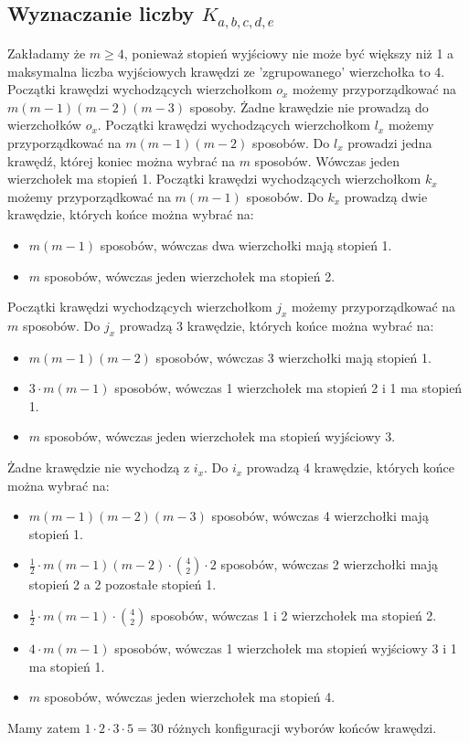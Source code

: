 \documentclass{article}
\begin{document}
\newpage

\subsection{Wyznaczanie liczby $K_{a,b,c,d,e}$}
Zakładamy że $m \geq 4$, ponieważ stopień wyjściowy nie może być większy niż 1 a maksymalna liczba wyjściowych krawędzi ze 'zgrupowanego' wierzchołka to 4.
\newline \newline
Początki krawędzi wychodzących wierzchołkom $o_x$ możemy przyporządkować na $m (m-1) (m-2) (m-3)$ sposoby.
Żadne krawędzie nie prowadzą do wierzchołków $o_x$.
\newline
Początki krawędzi wychodzących wierzchołkom $l_x$ możemy przyporządkować na $m (m-1) (m-2)$ sposobów.
Do $l_x$ prowadzi jedna krawędź, której koniec można wybrać na $m$ sposobów. Wówczas jeden wierzchołek ma stopień 1. 
\newline
Początki krawędzi wychodzących wierzchołkom $k_x$ możemy przyporządkować na $m (m-1)$ sposobów.
Do $k_x$ prowadzą dwie krawędzie, których końce można wybrać na:
\begin{itemize}
  \item $m (m-1)$ sposobów, wówczas dwa wierzchołki mają stopień 1.
  \item $m$ sposobów, wówczas jeden wierzchołek ma stopień 2.
\end{itemize}
Początki krawędzi wychodzących wierzchołkom $j_x$ możemy przyporządkować na $m$ sposobów.
Do $j_x$ prowadzą 3 krawędzie, których końce można wybrać na:
\begin{itemize}
  \item $m (m-1) (m-2)$ sposobów, wówczas 3 wierzchołki mają stopień 1.
  \item $3 \cdot m (m-1)$ sposobów, wówczas 1 wierzchołek ma stopień 2 i 1 ma stopień 1.
  \item $m$ sposobów, wówczas jeden wierzchołek ma stopień wyjściowy 3.
\end{itemize}
Żadne krawędzie nie wychodzą z $i_x$.
Do $i_x$ prowadzą 4 krawędzie, których końce można wybrać na:
\begin{itemize}
  \item $m (m-1) (m-2) (m-3)$ sposobów, wówczas 4 wierzchołki mają stopień 1.
  \item $\frac{1}{2} \cdot m (m-1) (m-2) \cdot \binom{4}{2} \cdot 2$ sposobów, wówczas 2 wierzchołki mają stopień 2 a 2 pozostałe stopień 1.
  \item $\frac{1}{2} \cdot m (m-1) \cdot \binom{4}{2}$ sposobów, wówczas 1 i 2 wierzchołek ma stopień 2.
  \item $4 \cdot m (m-1)$ sposobów, wówczas 1 wierzchołek ma stopień wyjściowy 3 i 1 ma stopień 1.
  \item $m$ sposobów, wówczas jeden wierzchołek ma stopień 4.
\end{itemize}
Mamy zatem $1 \cdot 2 \cdot 3 \cdot 5 = 30$ różnych konfiguracji wyborów końców krawędzi.
\end{document}
